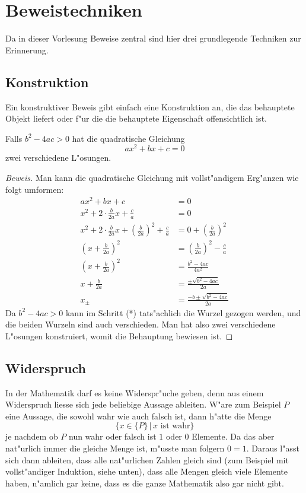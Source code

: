 \section{Beweistechniken}
Da in dieser Vorlesung Beweise zentral sind hier drei grundlegende 
Techniken zur Erinnerung.

\subsection{Konstruktion}
Ein konstruktiver Beweis gibt einfach eine Konstruktion an, die
das behauptete Objekt liefert oder f"ur die die behauptete Eigenschaft
offensichtlich ist. 

\begin{satz}
Falls $b^2-4ac>0$ hat die quadratische Gleichung
\[
ax^2+bx+c=0
\]
zwei verschiedene L"osungen.
\end{satz}

\begin{proof}[Beweis]
Man kann die quadratische Gleichung mit vollst"andigem Erg"anzen wie
folgt umformen:
\begin{align*}
ax^2+bx+c&=0\\
x^2+2\cdot \frac{b}{2a} x +\frac{c}a&=0\\
x^2+2\cdot \frac{b}{2a} x 
+\left(\frac{b}{2a}\right)^2
+\frac{c}a&=0
+\left(\frac{b}{2a}\right)^2\\
\left(x+\frac{b}{2a}\right)^2 &= \left(\frac{b}{2a}\right)^2 -\frac{c}a \\
\left(x+\frac{b}{2a}\right)^2 &=
\frac{b^2-4ac}{4a^2}\\
x+\frac{b}{2a}&=\frac{\pm\sqrt{b^2-4ac}}{2a}\tag{*}\\
x_{\pm}&=\frac{-b\pm\sqrt{b^2-4ac}}{2a}
\end{align*}
Da $b^2-4ac>0$ kann im Schritt (*) tats"achlich die Wurzel gezogen werden,
und die beiden Wurzeln sind auch verschieden. Man hat also zwei verschiedene
L"osungen konstruiert, womit die Behauptung bewiesen ist.
\end{proof}

\subsection{Widerspruch\label{widerspruchsbeweis}}
In der Mathematik darf es keine Widerspr"uche geben, denn aus einem
Widerspruch liesse sich jede beliebige Aussage ableiten. W"are zum
Beispiel $P$ eine Aussage, die sowohl wahr wie auch falsch ist,
dann h"atte die Menge
\[
\{x\in\{P\}\,|\, \text{$x$ ist wahr}\}
\]
je nachdem ob $P$ nun wahr oder falsch ist $1$ oder $0$ Elemente.
Da das aber nat"urlich immer die gleiche Menge ist, m"usste man
folgern $0=1$. Daraus l"asst sich dann ableiten, dass alle nat"urlichen
Zahlen gleich sind (zum Beispiel mit vollst"andiger Induktion, siehe
unten), dass alle Mengen gleich viele Elemente haben, n"amlich gar
keine, dass es die ganze Mathematik also gar nicht gibt.


